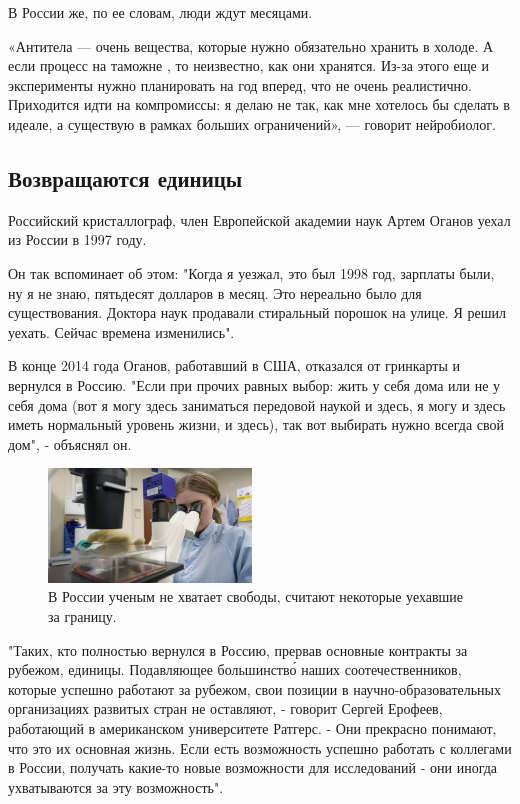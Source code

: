 В России же, по ее словам, люди ждут месяцами.

«Антитела --- очень  вещества, которые нужно обязательно хранить в холоде. А если процесс на таможне , то неизвестно, как они хранятся. Из-за этого еще и эксперименты нужно планировать на год вперед, что не очень реалистично. Приходится идти на компромиссы: я делаю не так, как мне хотелось бы сделать в идеале, а существую в рамках больших ограничений», --- говорит нейробиолог.

\subsection{Возвращаются единицы}

Российский кристаллограф, член Европейской академии наук Артем Оганов уехал из России в 1997 году.

Он так вспоминает об этом: "Когда я уезжал, это был 1998 год, зарплаты были, ну я не знаю, пятьдесят долларов в месяц. Это нереально было для существования. Доктора наук продавали стиральный порошок на улице. Я решил уехать. Сейчас времена изменились".


В конце 2014 года Оганов, работавший в США, отказался от гринкарты и вернулся в Россию. "Если при прочих равных выбор: жить у себя дома или не у себя дома (вот я могу здесь заниматься передовой наукой и здесь, я могу и здесь иметь нормальный уровень жизни, и здесь), так вот выбирать нужно всегда свой дом", - объяснял он.

\begin{figure}
    \begin{center}
        \includegraphics[width=0.48\textwidth]{img/microscope.png}
    \end{center}
    \caption{В России ученым не хватает свободы, считают некоторые уехавшие за границу.}
\end{figure}
"Таких, кто полностью вернулся в Россию, прервав основные контракты за рубежом, единицы. Подавляющее большинств\'{о} наших соотечественников, которые успешно работают за рубежом, свои позиции в научно-образовательных организациях развитых стран не оставляют, - говорит Сергей Ерофеев, работающий в американском университете Ратгерс. - Они прекрасно понимают, что это их основная жизнь. Если есть возможность успешно работать с коллегами в России, получать какие-то новые возможности для исследований - они иногда ухватываются за эту возможность".

